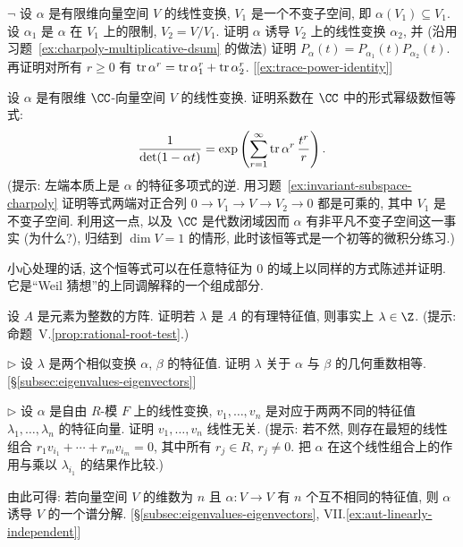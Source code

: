 \begin{prob}\label{ex:invariant-subspace-charpoly}
$\neg$ 设 $\alpha$ 是有限维向量空间 $V$ 的线性变换, $V_1$ 是一个不变子空间, 即 $\alpha(V_1)\subseteq V_1$. 设 $\alpha_1$ 是 $\alpha$ 在 $V_1$ 上的限制, $V_2=V/V_1$. 证明 $\alpha$ 诱导 $V_2$ 上的线性变换 $\alpha_2$, 并 (沿用习题~\ref{ex:charpoly-multiplicative-dsum} 的做法) 证明 $P_\alpha(t)=P_{\alpha_1}(t)P_{\alpha_2}(t)$. 再证明对所有 $r\ge0$ 有 $\operatorname{tr}\alpha^r=\operatorname{tr}\alpha_1^r+\operatorname{tr}\alpha_2^r$. [\ref{ex:trace-power-identity}]
\end{prob}

\begin{prob}\label{ex:trace-power-identity}
设 $\alpha$ 是有限维 $\CC$-向量空间 $V$ 的线性变换. 证明系数在 $\CC$ 中的形式幂级数恒等式:
\[
\frac{1}{\det(1-\alpha t)}=\exp\left(\sum_{r=1}^\infty \operatorname{tr}\alpha^r\,\frac{t^r}{r}\right).
\]
(提示: 左端本质上是 $\alpha$ 的特征多项式的逆. 用习题~\ref{ex:invariant-subspace-charpoly} 证明等式两端对正合列 $0\to V_1\to V\to V_2\to 0$ 都是可乘的, 其中 $V_1$ 是不变子空间. 利用这一点, 以及 $\CC$ 是代数闭域因而 $\alpha$ 有非平凡不变子空间这一事实 (为什么?), 归结到 $\dim V=1$ 的情形, 此时该恒等式是一个初等的微积分练习.)

小心处理的话, 这个恒等式可以在任意特征为 $0$ 的域上以同样的方式陈述并证明. 它是``Weil 猜想''的上同调解释的一个组成部分.
\end{prob}

\begin{prob}\label{ex:integer-rational-eigenvalue}
设 $A$ 是元素为整数的方阵. 证明若 $\lambda$ 是 $A$ 的有理特征值, 则事实上 $\lambda\in\Z$. (提示: 命题~V.\ref{prop:rational-root-test}.)
\end{prob}

\begin{prob}\label{ex:geometric-mult-similar}
$\triangleright$ 设 $\lambda$ 是两个相似变换 $\alpha$, $\beta$ 的特征值. 证明 $\lambda$ 关于 $\alpha$ 与 $\beta$ 的几何重数相等. [§\ref{subsec:eigenvalues-eigenvectors}]
\end{prob}

\begin{prob}\label{ex:distinct-eigenvectors-independent}
$\triangleright$ 设 $\alpha$ 是自由 $R$-模 $F$ 上的线性变换, $v_1,\ldots,v_n$ 是对应于两两不同的特征值 $\lambda_1,\ldots,\lambda_n$ 的特征向量. 证明 $v_1,\ldots,v_n$ 线性无关. (提示: 若不然, 则存在最短的线性组合 $r_1v_{i_1}+\cdots+r_mv_{i_m}=0$, 其中所有 $r_j\in R$, $r_j\neq0$. 把 $\alpha$ 在这个线性组合上的作用与乘以 $\lambda_{i_1}$ 的结果作比较.)

由此可得: 若向量空间 $V$ 的维数为 $n$ 且 $\alpha:V\to V$ 有 $n$ 个互不相同的特征值, 则 $\alpha$ 诱导 $V$ 的一个谱分解. [§\ref{subsec:eigenvalues-eigenvectors}, VII.\ref{ex:aut-linearly-independent}]
\end{prob}

